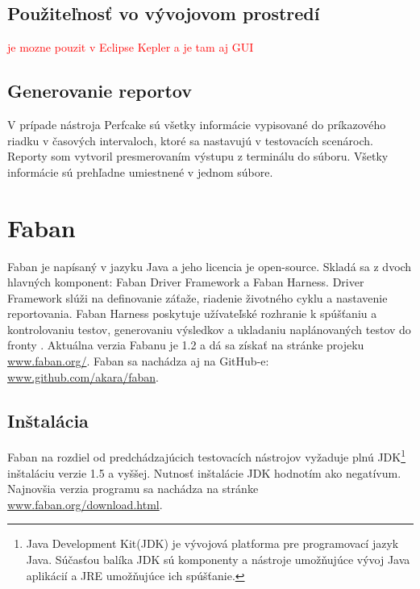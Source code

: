 \documentclass[12pt,oneside,final]{fithesis-utf8}
\newcommand\todo[1]{\textcolor{red}{#1}}
\begin{document}
\subsection{Použiteľnosť vo vývojovom prostredí}
\todo{je mozne pouzit v Eclipse Kepler a je tam aj GUI}

\subsection{Generovanie reportov}
V prípade nástroja Perfcake sú všetky informácie vypisované do príkazového riadku v časových intervaloch, ktoré sa nastavujú v testovacích scenároch. Reporty som vytvoril presmerovaním výstupu z terminálu do súboru. Všetky informácie sú prehľadne umiestnené v jednom súbore.

\newpage
\section{Faban}
Faban je napísaný v jazyku Java a jeho licencia je open-source. Skladá sa z dvoch hlavných komponent: Faban Driver Framework a Faban Harness. Driver Framework slúži na definovanie záťaže, riadenie životného cyklu a nastavenie reportovania. Faban Harness poskytuje užívateľské rozhranie k spúšťaniu a kontrolovaniu testov, generovaniu výsledkov a ukladaniu naplánovaných testov do fronty \cite{Faban}. Aktuálna verzia  Fabanu je 1.2 a dá sa získať na stránke projeku \url{www.faban.org/}. Faban sa nachádza aj na GitHub-e: \url{www.github.com/akara/faban}.

\subsection{Inštalácia}
Faban na rozdiel od predchádzajúcich testovacích nástrojov vyžaduje plnú JDK\footnote{Java Development Kit(JDK) je vývojová platforma pre programovací jazyk Java. Súčasťou balíka JDK sú komponenty a nástroje umožňujúce vývoj Java aplikácií a JRE umožňujúce ich spúšťanie.} inštaláciu verzie 1.5 a vyššej. Nutnosť inštalácie JDK hodnotím ako negatívum. Najnovšia verzia programu sa nachádza na stránke \url{www.faban.org/download.html}.
\end{document}
